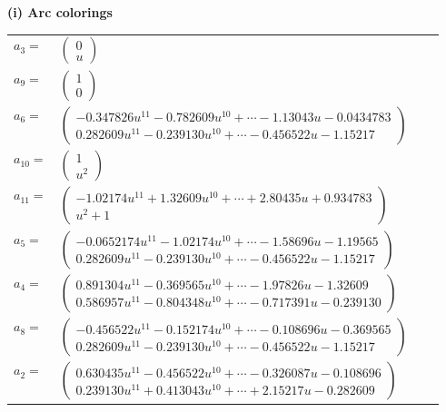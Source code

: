 \documentclass[1p]{elsarticle_modified}
\theoremstyle{definition}
\begin{document}
\flushleft \textbf{(i) Arc colorings}\\
\begin{tabular}{m{7pt} m{180pt} m{7pt} m{180pt} }
\flushright $a_{3}=$&$\begin{pmatrix}0\\u\end{pmatrix}$ \\
\flushright $a_{9}=$&$\begin{pmatrix}1\\0\end{pmatrix}$ \\
\flushright $a_{6}=$&$\begin{pmatrix}-0.347826 u^{11}-0.782609 u^{10}+\cdots-1.13043 u-0.0434783\\0.282609 u^{11}-0.239130 u^{10}+\cdots-0.456522 u-1.15217\end{pmatrix}$ \\
\flushright $a_{10}=$&$\begin{pmatrix}1\\u^2\end{pmatrix}$ \\
\flushright $a_{11}=$&$\begin{pmatrix}-1.02174 u^{11}+1.32609 u^{10}+\cdots+2.80435 u+0.934783\\u^2+1\end{pmatrix}$ \\
\flushright $a_{5}=$&$\begin{pmatrix}-0.0652174 u^{11}-1.02174 u^{10}+\cdots-1.58696 u-1.19565\\0.282609 u^{11}-0.239130 u^{10}+\cdots-0.456522 u-1.15217\end{pmatrix}$ \\
\flushright $a_{4}=$&$\begin{pmatrix}0.891304 u^{11}-0.369565 u^{10}+\cdots-1.97826 u-1.32609\\0.586957 u^{11}-0.804348 u^{10}+\cdots-0.717391 u-0.239130\end{pmatrix}$ \\
\flushright $a_{8}=$&$\begin{pmatrix}-0.456522 u^{11}-0.152174 u^{10}+\cdots-0.108696 u-0.369565\\0.282609 u^{11}-0.239130 u^{10}+\cdots-0.456522 u-1.15217\end{pmatrix}$ \\
\flushright $a_{2}=$&$\begin{pmatrix}0.630435 u^{11}-0.456522 u^{10}+\cdots-0.326087 u-0.108696\\0.239130 u^{11}+0.413043 u^{10}+\cdots+2.15217 u-0.282609\end{pmatrix}$ \\

\end{tabular}
\end{document}
